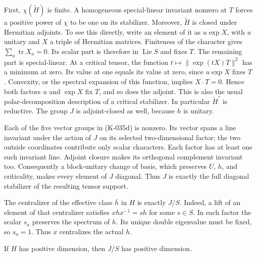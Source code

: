 First, $\chi(\widetilde H)$ is finite.  A homogeneous special-linear
invariant nonzero at $T$ forces a positive power of $\chi$ to be
one on its stabilizer.  Moreover, $\widetilde H$ is closed under
Hermitian adjoints.  To see this directly, write an element of it as
$u\exp X$, with $u$ unitary and $X$ a triple of Hermitian matrices.
Finiteness of the character gives $\sum_a\operatorname{tr}X_a=0$.
Its scalar part is therefore in $\operatorname{Lie}S$ and fixes $T$.
The remaining part is special-linear.  At a critical tensor, the
function $t\mapsto\|\exp(tX)T\|^2$ has a minimum at zero.  Its value
at one equals its value at zero, since $u\exp X$ fixes $T$.
Convexity, or the spectral expansion of this function, implies
$X\cdot T=0$.  Hence both factors $u$ and $\exp X$ fix $T$, and
so does the adjoint.  This is also the usual polar-decomposition
description of a critical stabilizer.  In particular
$\widetilde H^\circ$ is reductive.  The group $J$ is adjoint-closed
as well, because $h$ is unitary.

Each of the five vector groups in (K-035d) is nonzero.  Its vector
spans a line invariant under the action of $J$ on its selected
two-dimensional factor; the two outside coordinates contribute
only scalar characters.  Each factor has at least one such
invariant line.  Adjoint closure makes its orthogonal complement
invariant too.  Consequently a block-unitary change of basis,
which preserves $U$, $h$, and criticality, makes every element
of $J$ diagonal.  Thus $J$ is exactly the full diagonal stabilizer
of the resulting tensor support.

The centralizer of the effective class $\bar h$ in $H$ is exactly
$J/S$.  Indeed, a lift of an element of that centralizer satisfies
$x h x^{-1}=s h$ for some $s\in S$.  In each factor the scalar
$s_a$ preserves the spectrum of $h$.  Its unique double eigenvalue
must be fixed, so $s_a=1$.  Thus $x$ centralizes the actual $h$.

\begin{lemma}[K-035b]
If $H$ has positive dimension, then $J/S$ has positive dimension.
\end{lemma}

